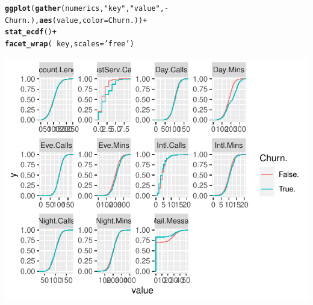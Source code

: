\documentclass{article}\usepackage[]{graphicx}\usepackage[]{color}
\makeatletter
\def\maxwidth{ %
  \ifdim\Gin@nat@width>\linewidth
    \linewidth
  \else
    \Gin@nat@width
  \fi
}
\newcommand{\hlstr}[1]{\textcolor[rgb]{0.192,0.494,0.8}{#1}}%
\newcommand{\hlopt}[1]{\textcolor[rgb]{0,0,0}{#1}}%
\newcommand{\hlstd}[1]{\textcolor[rgb]{0.345,0.345,0.345}{#1}}%
\newcommand{\hlkwc}[1]{\textcolor[rgb]{0.333,0.667,0.333}{#1}}%
\newcommand{\hlkwd}[1]{\textcolor[rgb]{0.737,0.353,0.396}{\textbf{#1}}}%
\newenvironment{kframe}{%
 \def\at@end@of@kframe{}%
 \ifinner\ifhmode%
  \def\at@end@of@kframe{\end{minipage}}%
  \begin{minipage}{\columnwidth}%
 \fi\fi%
 \def\FrameCommand##1{\hskip\@totalleftmargin \hskip-\fboxsep
 \colorbox{shadecolor}{##1}\hskip-\fboxsep
     \hskip-\linewidth \hskip-\@totalleftmargin \hskip\columnwidth}%
 \MakeFramed {\advance\hsize-\width
   \@totalleftmargin\z@ \linewidth\hsize
   \@setminipage}}%
 {\par\unskip\endMakeFramed%
 \at@end@of@kframe}
\newenvironment{knitrout}{}{} %
\makeatother
\begin{document}
\begin{knitrout}
{}


\begin{kframe}\begin{alltt}
\hlkwd{ggplot}\hlstd{(}\hlkwd{gather}\hlstd{(numerics,} \hlstr{"key"}\hlstd{,} \hlstr{"value"}\hlstd{,} \hlopt{-}\hlstd{Churn.),} \hlkwd{aes}\hlstd{(value,} \hlkwc{color}\hlstd{=Churn.))} \hlopt{+}
  \hlkwd{stat_ecdf}\hlstd{()} \hlopt{+}
  \hlkwd{facet_wrap}\hlstd{(}\hlopt{~}\hlstd{key,} \hlkwc{scales}\hlstd{=}\hlstr{'free'}\hlstd{)}
\end{alltt}
\end{kframe}

{\centering \includegraphics[width=\maxwidth]{figure/Overviews_plots_grouped-4} 

}



\end{knitrout}
\end{document}
